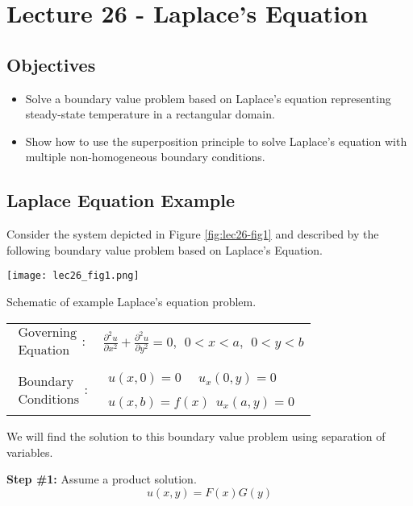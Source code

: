 \chapter{Lecture 26 - Laplace's Equation}
\label{ch:lec26}
\section{Objectives}
\begin{itemize}
\item Solve a boundary value problem based on Laplace's equation representing steady-state temperature in a rectangular domain.
\item Show how to use the superposition principle to solve Laplace's equation with multiple non-homogeneous boundary conditions.
\end{itemize}
\setcounter{lstannotation}{0} %

\section{Laplace Equation Example}
Consider the system depicted in Figure \ref{fig:lec26-fig1} and described by the following boundary value problem based on Laplace's Equation.
\begin{marginfigure}
\texttt{[image: lec26\_fig1.png]}
\caption{Schematic of example Laplace's equation problem.}
\label{fig:lec26-fig1}
\end{marginfigure}
\begin{table}[h]
\begin{tabular}{l l}
$\substack{\text{Governing} \\\text{Equation}}: $& $\frac{\partial^2 u}{\partial x^2} + \frac{\partial^2 u}{\partial y^2} = 0, \ \ 0<x<a, \ \ 0<y<b $\\
& \\
$\substack{\text{Boundary} \\ \text{Conditions}}: $ & $\substack{u(x,0)=0  \ \ \ \ \ \ u_x(0,y) = 0 \\ \\ u(x,b) = f(x) \ \ u_x(a,y) = 0}$ 
\end{tabular}
\end{table} 
We will find the solution to this boundary value problem using separation of variables.

\vspace{0.25cm}

\noindent\textbf{Step \#1:} Assume a product solution.
\begin{equation*}
u(x,y) = F(x)G(y)
\end{equation*}

